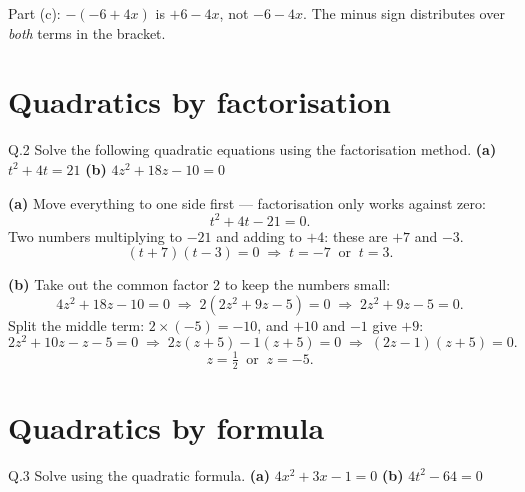 \begin{pitfall}
Part (c): $-(-6+4x)$ is $+6-4x$, not $-6-4x$. The minus sign distributes over
\emph{both} terms in the bracket.
\end{pitfall}

\section{Quadratics by factorisation}

\begin{question}{Q.2}
Solve the following quadratic equations using the factorisation method.
\textbf{(a)} $t^{2}+4t=21$ \quad \textbf{(b)} $4z^{2}+18z-10=0$
\end{question}

\begin{solution}
\textbf{(a)} Move everything to one side first --- factorisation only works
against zero:
\[
t^{2}+4t-21=0 .
\]
Two numbers multiplying to $-21$ and adding to $+4$: these are $+7$ and $-3$.
\[
(t+7)(t-3)=0 \;\Longrightarrow\; t=-7 \ \text{ or } \ t=3 .
\]

\medskip
\textbf{(b)} Take out the common factor 2 to keep the numbers small:
\[
4z^{2}+18z-10=0 \;\Longrightarrow\; 2\left(2z^{2}+9z-5\right)=0
\;\Longrightarrow\; 2z^{2}+9z-5=0 .
\]
Split the middle term: $2\times(-5)=-10$, and $+10$ and $-1$ give $+9$:
\[
2z^{2}+10z-z-5=0 \;\Longrightarrow\; 2z(z+5)-1(z+5)=0
\;\Longrightarrow\; (2z-1)(z+5)=0 .
\]
\[
z=\tfrac{1}{2} \ \text{ or } \ z=-5 .
\]

\end{solution}

\section{Quadratics by formula}

\begin{question}{Q.3}
Solve using the quadratic formula.
\textbf{(a)} $4x^{2}+3x-1=0$ \quad \textbf{(b)} $4t^{2}-64=0$
\end{question}

